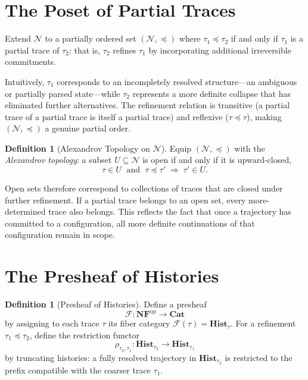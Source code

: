 \documentclass[12pt, oneside]{amsbook}
\theoremstyle{plain}
\theoremstyle{definition}
\newtheorem{definition}[theorem]{Definition}
\theoremstyle{remark}
\newcommand{\NF}{\mathcal{N}}
\begin{document}
\section{The Poset of Partial Traces}

Extend $\NF$ to a partially ordered set $(\NF, \preceq)$ where
$\tau_1 \preceq \tau_2$ if and only if $\tau_1$ is a partial trace of
$\tau_2$: that is, $\tau_2$ refines $\tau_1$ by incorporating additional
irreversible commitments.

Intuitively, $\tau_1$ corresponds to an incompletely resolved structure---an
ambiguous or partially parsed state---while $\tau_2$ represents a more
definite collapse that has eliminated further alternatives. The refinement
relation is transitive (a partial trace of a partial trace is itself a
partial trace) and reflexive ($\tau \preceq \tau$), making $(\NF, \preceq)$
a genuine partial order.

\begin{definition}[Alexandrov Topology on $\NF$]
Equip $(\NF, \preceq)$ with the \emph{Alexandrov topology}: a subset
$U \subseteq \NF$ is open if and only if it is upward-closed,
\[
  \tau \in U \;\text{ and }\; \tau \preceq \tau' \;\Rightarrow\; \tau' \in U.
\]
\end{definition}

Open sets therefore correspond to collections of traces that are closed
under further refinement. If a partial trace belongs to an open set, every
more-determined trace also belongs. This reflects the fact that once a
trajectory has committed to a configuration, all more definite continuations
of that configuration remain in scope.

\section{The Presheaf of Histories}

\begin{definition}[Presheaf of Histories]
Define a presheaf
\[
  \mathcal{F} : \mathbf{NF}^{\mathrm{op}} \to \mathbf{Cat}
\]
by assigning to each trace $\tau$ its fiber category $\mathcal{F}(\tau) =
\mathbf{Hist}_\tau$. For a refinement $\tau_1 \preceq \tau_2$, define the
restriction functor
\[
  \rho_{\tau_2, \tau_1} : \mathbf{Hist}_{\tau_2} \to \mathbf{Hist}_{\tau_1}
\]
by truncating histories: a fully resolved trajectory in $\mathbf{Hist}_{\tau_2}$
is restricted to the prefix compatible with the coarser trace $\tau_1$.
\end{definition}
\end{document}
